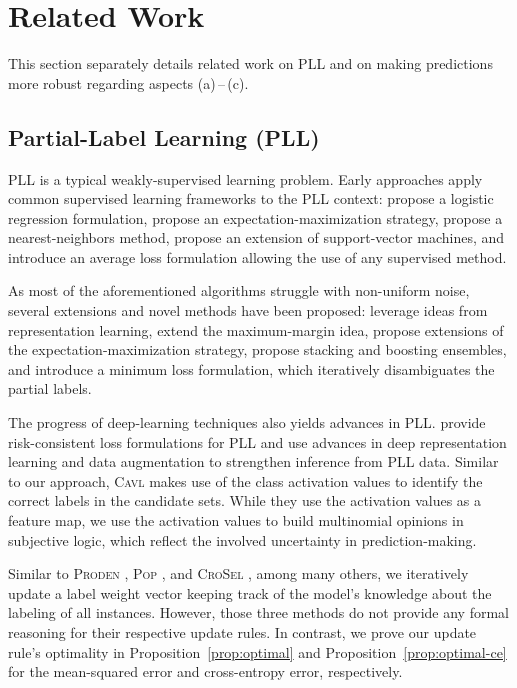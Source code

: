 \section{Related Work}
\label{sec:related-work}
This section separately details related work on PLL and on making predictions more robust regarding aspects (a)\,--\,(c).

\subsection{Partial-Label Learning (PLL)}
PLL is a typical weakly-supervised learning problem.
Early approaches apply common supervised learning frameworks to the PLL context:
\citet{grandvalet2002logistic} propose a logistic regression formulation,
\citet{JinG02} propose an expectation-maximization strategy,
\citet{HullermeierB06} propose a nearest-neighbors method,
\citet{NguyenC08} propose an extension of support-vector machines,
and \citet{CourST11} introduce an average loss formulation allowing the use of any supervised method.

As most of the aforementioned algorithms struggle with non-uniform noise, several extensions and novel methods have been proposed:
\citet{ZhangY15a,ZhangZL16,XuLG19,WangLZ19,FengA19,NiZDCL21} leverage ideas from representation learning,
\citet{YuZ17,WangLZ19,FengA19,NiZDCL21} extend the maximum-margin idea,
\citet{LiuD12,LvXF0GS20} propose extensions of the expectation-maximization strategy,
\citet{ZhangYT17,TangZ17,WuZ18} propose stacking and boosting ensembles,
and \citet{LvXF0GS20,CabannesRB20} introduce a minimum loss formulation, which iteratively disambiguates the partial labels.

The progress of deep-learning techniques also yields advances in PLL.
\citet{FengL0X0G0S20,LvXF0GS20} provide risk-consistent loss formulations for PLL and \citet{XuQGZ21,WangXLF0CZ22,HeFLLY22,ZhangF0L0QS22,0009LLQG23,fan2024kmt,crosel2024} use advances in deep representation learning and data augmentation to strengthen inference from PLL data.
Similar to our approach, \textsc{Cavl} \citep{ZhangF0L0QS22} makes use of the class activation values to identify the correct labels in the candidate sets.
While they use the activation values as a feature map, we use the activation values to build multinomial opinions in subjective logic, which reflect the involved uncertainty in prediction-making.

Similar to \textsc{Proden} \citep{LvXF0GS20}, \textsc{Pop} \citep{0009LLQG23}, and \textsc{CroSel} \citep{crosel2024}, among many others, we iteratively update a label weight vector keeping track of the model's knowledge about the labeling of all instances.
However, those three methods do not provide any formal reasoning for their respective update rules.
In contrast, we prove our update rule's optimality in Proposition~\ref{prop:optimal} and Proposition~\ref{prop:optimal-ce} for the mean-squared error and cross-entropy error, respectively.

